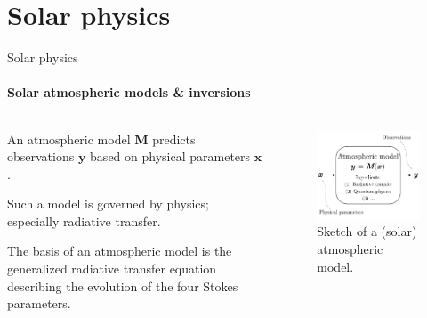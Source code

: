 \documentclass{beamer}
\newcommand\vect[1]{\ensuremath{\bm{#1}}}
\begin{document}
\section{Solar physics}
\begin{frame}[allowframebreaks]{Solar physics}
	\framesubtitle{Solar atmospheric models \& inversions}

	\begin{columns}
		\begin{column}{0.49\textwidth}
An atmospheric model $\vect{M}$ predicts observations $\vect{y}$ based on physical parameters $\vect{x}$.

Such a model is governed by physics; especially radiative transfer.

The basis of an atmospheric model is the generalized radiative transfer equation describing the evolution of the four Stokes parameters.
		\end{column}
		
		\begin{column}{0.5\textwidth}
\begin{figure}[h!] 
\centering
\includegraphics[width=\textwidth]{figures/presentation/inversions.pdf}
\caption{Sketch of a (solar) atmospheric model.}
\label{fig:inversions}
\end{figure}
		\end{column}
	\end{columns}
\end{frame}

%
%
%
%
\end{document}
